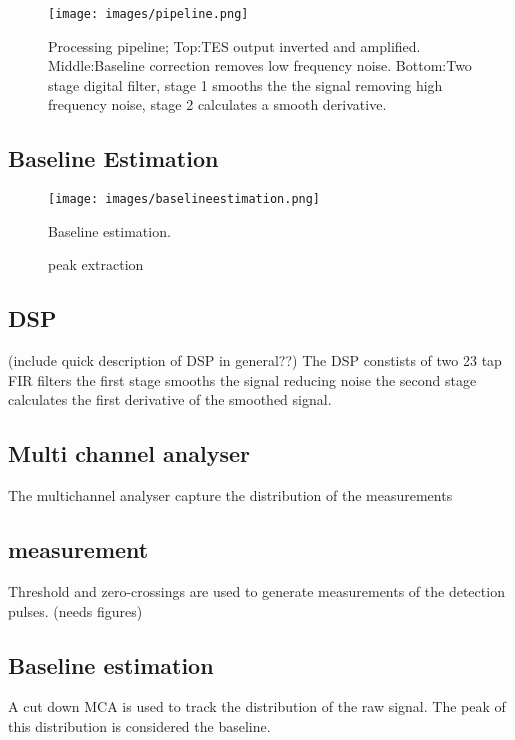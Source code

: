 \documentclass{article}
\begin{document}
\begin{figure}[!hpbt]
  \centering
  \texttt{[image: images/pipeline.png]}
  \caption{
    Processing pipeline; Top:TES output inverted and amplified. Middle:Baseline
    correction removes low frequency noise. Bottom:Two stage digital filter,
    stage 1 smooths the the signal removing high frequency noise, stage 2
    calculates a smooth derivative.
  }
  \label{fig:pipeline}
\end{figure}


\subsection{Baseline Estimation}

\begin{figure}[!hpbt]
  \centering
  \texttt{[image: images/baselineestimation.png]}
  \caption{
    Baseline estimation.
  }
  \label{fig:baselineestimation}
\end{figure}


\begin{figure}[!hpbt]
  \centering
  
  \caption{
    peak extraction
  }
  \label{fig:peakextraction}
\end{figure}



\subsection{DSP}
(include quick description of DSP in general??)
The DSP constists of two 23 tap FIR filters the first stage smooths the signal
reducing noise the second stage calculates the first derivative of the smoothed
signal.

\subsection{Multi channel analyser}
The multichannel analyser capture the distribution of the measurements
\subsection{measurement}
Threshold and zero-crossings are used to generate measurements of the detection
pulses. (needs figures)
\subsection{Baseline estimation}
A cut down MCA is used to track the distribution of the raw signal. The peak of
this distribution is considered the baseline. 
\end{document}
